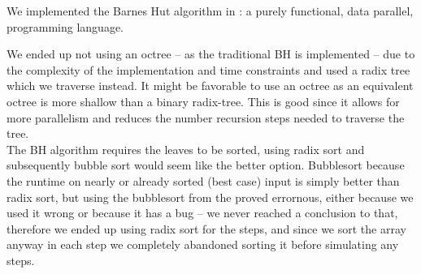 We implemented the Barnes Hut algorithm in
: a purely functional,
data parallel, programming language.

We ended up not using an octree -- as the traditional BH is implemented -- due
to the complexity of the implementation and time constraints and used a radix
tree which we traverse instead. It might be favorable to use an octree as an
equivalent octree is more shallow than a binary radix-tree. This is good since
it allows for more parallelism and reduces the number recursion steps needed to
traverse the tree.\\

\noindent
The BH algorithm requires the leaves to be sorted, using radix sort and
subsequently bubble sort would seem like the better option. Bubblesort because
the runtime on nearly or already sorted (best case) input is simply better than
radix sort, but using the bubblesort from the
proved errornous, either because we used it wrong or because it has a bug -- we
never reached a conclusion to that, therefore we ended up using radix sort for
the steps, and since we sort the array anyway in each step we completely
abandoned sorting it before simulating any steps.

